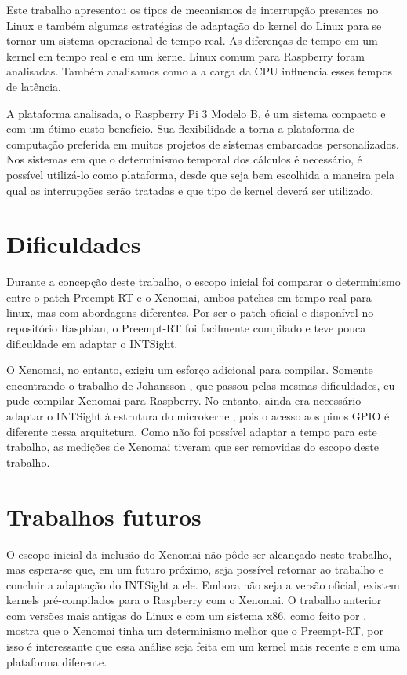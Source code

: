 
Este trabalho apresentou os tipos de mecanismos de interrupção presentes no Linux e também algumas estratégias de adaptação do kernel do Linux para se tornar um sistema operacional de tempo real. As diferenças de tempo em um kernel em tempo real e em um kernel Linux comum para Raspberry foram analisadas. Também analisamos como a a carga da CPU influencia esses tempos de latência.

A plataforma analisada, o Raspberry Pi 3 Modelo B, é um sistema compacto e com um ótimo custo-benefício. Sua flexibilidade a torna a plataforma de computação preferida em muitos projetos de sistemas embarcados personalizados. Nos sistemas em que o determinismo temporal dos cálculos é necessário, é possível utilizá-lo como plataforma, desde que seja bem escolhida a maneira pela qual as interrupções serão tratadas e que tipo de kernel deverá ser utilizado.

\section{Dificuldades}

Durante a concepção deste trabalho, o escopo inicial foi comparar o determinismo entre o patch Preempt-RT e o Xenomai, ambos patches em tempo real para linux, mas com abordagens diferentes. Por ser o patch oficial e disponível no repositório Raspbian, o Preempt-RT foi facilmente compilado e teve pouca dificuldade em adaptar o INTSight.

O Xenomai, no entanto, exigiu um esforço adicional para compilar. Somente encontrando o trabalho de Johansson \cite{Johansson2018}, que passou pelas mesmas dificuldades, eu pude compilar Xenomai para Raspberry. No entanto, ainda era necessário adaptar o INTSight à estrutura do microkernel, pois o acesso aos pinos GPIO é diferente nessa arquitetura. Como não foi possível adaptar a tempo para este trabalho, as medições de Xenomai tiveram que ser removidas do escopo deste trabalho.

\section{Trabalhos futuros}

O escopo inicial da inclusão do Xenomai não pôde ser alcançado neste trabalho, mas espera-se que, em um futuro próximo, seja possível retornar ao trabalho e concluir a adaptação do INTSight a ele. Embora não seja a versão oficial, existem kernels pré-compilados para o Raspberry com o Xenomai. O trabalho anterior com versões mais antigas do Linux e com um sistema x86, como feito por \cite{Regnier2008}, mostra que o Xenomai tinha um determinismo melhor que o Preempt-RT, por isso é interessante que essa análise seja feita em um kernel mais recente e em uma plataforma diferente.
